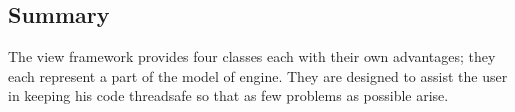 \subsection*{Summary}

The view framework provides four classes each with their own advantages;
they each represent a part of the model of engine. They are designed
to assist the user in keeping his code threadsafe so that as few problems
as possible arise.
